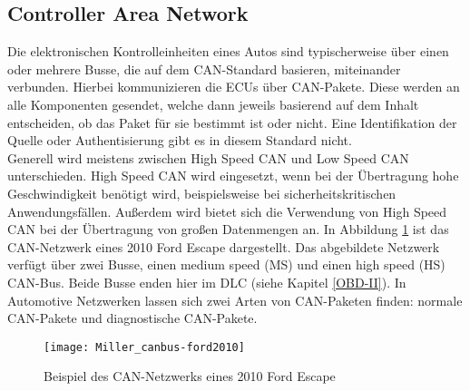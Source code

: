 \subsection{Controller Area Network}
Die elektronischen Kontrolleinheiten eines Autos sind typischerweise über einen oder mehrere Busse, die auf dem \ac{CAN}-Standard basieren, miteinander verbunden. Hierbei kommunizieren die \acsp{ECU} über \acs{CAN}-Pakete. Diese werden an alle Komponenten gesendet, welche dann jeweils basierend auf dem Inhalt entscheiden, ob das Paket für sie bestimmt ist oder nicht. Eine Identifikation der Quelle oder Authentisierung gibt es in diesem Standard nicht. \cite[vgl.][7]{Miller.2013} \\
Generell wird meistens zwischen High Speed \acs{CAN} und Low Speed \acs{CAN} unterschieden. High Speed \acs{CAN} wird eingesetzt, wenn bei der Übertragung hohe Geschwindigkeit benötigt wird, beispielsweise bei sicherheitskritischen Anwendungsfällen. Außerdem wird bietet sich die Verwendung von High Speed \acs{CAN} bei der Übertragung von großen Datenmengen an.
In Abbildung \ref{fig:canbus-ford2010} ist das \acs{CAN}-Netzwerk eines 2010 Ford Escape dargestellt. Das abgebildete Netzwerk verfügt über zwei Busse, einen medium speed (MS) und einen high speed (HS) \acs{CAN}-Bus. Beide Busse enden hier im \ac{DLC} (siehe Kapitel \ref{OBD-II}).
In Automotive Netzwerken lassen sich zwei Arten von \acs{CAN}-Paketen finden: normale \acs{CAN}-Pakete und diagnostische \acs{CAN}-Pakete. 

\begin{figure}[H]
\centering
\texttt{[image: Miller\_canbus-ford2010]}
\label{fig:canbus-ford2010}
\caption{Beispiel des \acs{CAN}-Netzwerks eines 2010 Ford Escape}
\end{figure}

